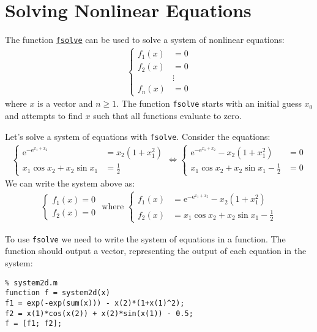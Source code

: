 \documentclass[12pt, a4paper]{article}
\newcommand{\e}[1]{\text{e}^{#1}}
\begin{document}
\section{Solving Nonlinear Equations}
\label{sec:org800f193}
The function \href{https://www.mathworks.com/help/optim/ug/fsolve.html?s\_tid=doc\_ta}{\texttt{fsolve}} can be used to solve a system of nonlinear equations:
\begin{align*}
\begin{cases}
  f_1(x) &= 0\\
  f_2(x) &= 0\\
         &\vdots\\
  f_n(x) &= 0
\end{cases}
\end{align*}
where \(x\) is a vector and \(n\geq 1\).
The function \texttt{fsolve} starts with an initial guess \(x_0\) and attempts to find \(x\) such that all functions evaluate to zero.

Let's solve a system of equations with \texttt{fsolve}.
Consider the equations:
\begin{align*}
\begin{cases}
  \e{-\e{x_1+x_2}}&=x_2(1+x_1^2)\\
  x_1\cos{x_2}+x_2\sin{x_1}&=\frac{1}{2}
\end{cases}\iff
\begin{cases}
  \e{-\e{x_1+x_2}}-x_2(1+x_1^2)&=0\\
  x_1\cos{x_2}+x_2\sin{x_1}-\frac{1}{2}&=0
\end{cases}
\end{align*}
We can write the system above as:
\begin{align*}
  \begin{cases}
    f_1(x)=0\\
    f_2(x)=0
  \end{cases}\text{ where }
  \begin{cases}
  f_1(x) &= \e{-\e{x_1+x_2}}-x_2(1+x_1^2)\\
  f_2(x) &= x_1\cos{x_2}+x_2\sin{x_1}-\frac{1}{2}
  \end{cases}
\end{align*}

To use \texttt{fsolve} we need to write the system of equations in a function.
The function should output a vector, representing the output of each equation in the system:
\lstset{language=matlab,label= ,caption= ,captionpos=b,firstnumber=1,numbers=left,style=Matlab-editor}
\begin{lstlisting}
% system2d.m
function f = system2d(x)
f1 = exp(-exp(sum(x))) - x(2)*(1+x(1)^2);
f2 = x(1)*cos(x(2)) + x(2)*sin(x(1)) - 0.5;
f = [f1; f2];
\end{lstlisting}
\end{document}
